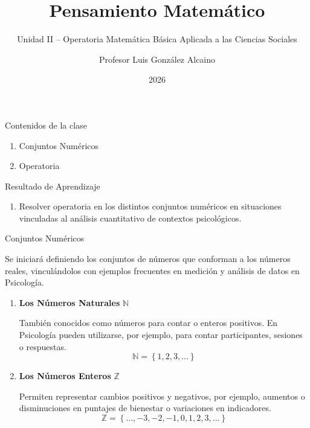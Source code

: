 \documentclass[aspectratio=169,handout,11pt]{beamer}
\title{Pensamiento Matemático}
\subtitle{Unidad II -- Operatoria Matemática Básica Aplicada a las Ciencias Sociales}
\author{Profesor Luis González Alcaino}
\institute{Universidad Santo Tomás\\Departamento Ciencias Básicas - Talca}
\date{2026}
\begin{document}
	
	\begin{frame}
		\titlepage
	\end{frame}
	
	\begin{frame}{Contenidos de la clase}
		\begin{enumerate}
			\item Conjuntos Numéricos
			\item Operatoria
		\end{enumerate}
	\end{frame}
	
	\begin{frame}{Resultado de Aprendizaje}
		\begin{enumerate}
			\item Resolver operatoria en los distintos conjuntos numéricos en situaciones vinculadas al análisis cuantitativo de contextos psicológicos.
		\end{enumerate}
	\end{frame}
	
	\begin{frame}{Conjuntos Numéricos}
		\begin{block}{}
			Se iniciará definiendo los conjuntos de números que conforman a los números reales, vinculándolos con ejemplos frecuentes en medición y análisis de datos en Psicología.
			
			\begin{enumerate}
				\item \textbf{Los Números Naturales} $\mathbb{N}$
				
				También conocidos como números para contar o enteros positivos. En Psicología pueden utilizarse, por ejemplo, para contar participantes, sesiones o respuestas.
				\[
				\mathbb{N}=\left\{1,2,3,\ldots\right\}
				\]
				
				\pause
				
				\item \textbf{Los Números Enteros} $\mathbb{Z}$
				
				Permiten representar cambios positivos y negativos, por ejemplo, aumentos o disminuciones en puntajes de bienestar o variaciones en indicadores.
				\[
				\mathbb{Z}=\left\{\ldots,-3,-2,-1,0,1,2,3,\ldots\right\}
				\]
			\end{enumerate}
		\end{block}
	\end{frame}
	
\end{document}
